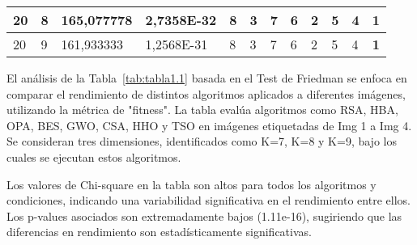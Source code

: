 \documentclass[conference]{IEEEtran}
\begin{document}
\begin{table*}[]
\begin{tabular}{|llll|llllllll|}
\multicolumn{1}{|l|}{20}                                                    & \multicolumn{1}{l|}{8}                                                        & \multicolumn{1}{l|}{165,077778}                                                   & 2,7358E-32                     & \multicolumn{1}{l|}{8}                                                  & \multicolumn{1}{l|}{3}                                                  & \multicolumn{1}{l|}{7}                                                  & \multicolumn{1}{l|}{6}                                                  & \multicolumn{1}{l|}{2}                                                  & \multicolumn{1}{l|}{5}                                                  & \multicolumn{1}{l|}{4}                                                  & \textbf{1}                 \\ \hline
\multicolumn{1}{|l|}{20}                                                    & \multicolumn{1}{l|}{9}                                                        & \multicolumn{1}{l|}{161,933333}                                                   & 1,2568E-31                     & \multicolumn{1}{l|}{8}                                                  & \multicolumn{1}{l|}{3}                                                  & \multicolumn{1}{l|}{7}                                                  & \multicolumn{1}{l|}{6}                                                  & \multicolumn{1}{l|}{2}                                                  & \multicolumn{1}{l|}{5}                                                  & \multicolumn{1}{l|}{4}                                                  & \textbf{1}                 \\ \hline
\end{tabular}
\label{tab:tabla1.2}
\end{table*}


\noindent El análisis de la Tabla~\ref{tab:tabla1.1} basada en el Test de Friedman se enfoca en comparar el rendimiento de distintos algoritmos aplicados a diferentes imágenes, utilizando la métrica de "fitness". La tabla evalúa algoritmos como RSA, HBA, OPA, BES, GWO, CSA, HHO y TSO en imágenes etiquetadas de Img 1 a Img 4. Se consideran tres dimensiones, identificados como K=7, K=8 y K=9, bajo los cuales se ejecutan estos algoritmos.

\noindent Los valores de Chi-square en la tabla son altos para todos los algoritmos y condiciones, indicando una variabilidad significativa en el rendimiento entre ellos. Los p-values asociados son extremadamente bajos (1.11e-16), sugiriendo que las diferencias en rendimiento son estadísticamente significativas.
\end{document}
